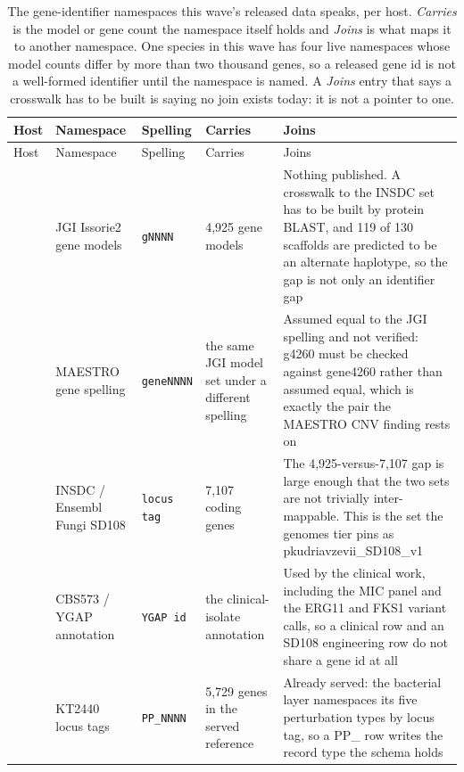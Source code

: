 \begingroup
\footnotesize
\begin{longtable}{@{}L{22mm} L{34mm} L{20mm} L{30mm} L{66mm}@{}}
\caption[]{The gene-identifier namespaces this wave's released data speaks, per host.
\emph{Carries} is the model or gene count the namespace itself holds and \emph{Joins} is
what maps it to another namespace. One species in this wave has four live namespaces
whose model counts differ by more than two thousand genes, so a released gene id is not
a well-formed identifier until the namespace is named. A \emph{Joins} entry that says a
crosswalk has to be built is saying no join exists today: it is not a pointer to one.}
\label{tab:namespaces}\\
\toprule
Host & Namespace & Spelling & Carries & Joins \\
\midrule
\endfirsthead
\toprule
Host & Namespace & Spelling & Carries & Joins \\
\midrule
\endhead
\bottomrule
\endfoot
{} & JGI Issorie2 gene models & \texttt{gNNNN} & 4,925 gene models & Nothing published. A crosswalk to the INSDC set has to be built by protein BLAST, and 119 of 130 scaffolds are predicted to be an alternate haplotype, so the gap is not only an identifier gap \\
\addlinespace[5pt]
 & MAESTRO gene spelling & \texttt{geneNNNN} & the same JGI model set under a different spelling & Assumed equal to the JGI spelling and not verified: g4260 must be checked against gene4260 rather than assumed equal, which is exactly the pair the MAESTRO CNV finding rests on \\
\addlinespace[5pt]
 & INSDC / Ensembl Fungi SD108 & \texttt{locus tag} & 7,107 coding genes & The 4,925-versus-7,107 gap is large enough that the two sets are not trivially inter-mappable. This is the set the genomes tier pins as pkudriavzevii\_SD108\_v1 \\
\addlinespace[5pt]
 & CBS573 / YGAP annotation & \texttt{YGAP id} & the clinical-isolate annotation & Used by the clinical work, including the MIC panel and the ERG11 and FKS1 variant calls, so a clinical row and an SD108 engineering row do not share a gene id at all \\
\addlinespace[5pt]
 & KT2440 locus tags & \texttt{PP\_NNNN} & 5,729 genes in the served reference & Already served: the bacterial layer namespaces its five perturbation types by locus tag, so a PP\_ row writes the record type the schema holds \\

\end{longtable}

